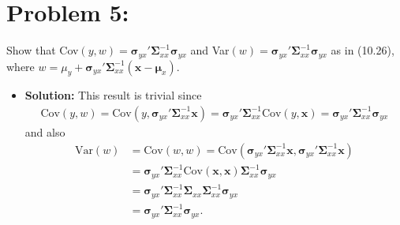 \documentclass[11pt]{article}
\begin{document}
\section*{Problem 5:}
Show that Cov$(y,w) = \bm\sigma_{yx}'\bm\Sigma_{xx}^{-1}\bm\sigma_{yx}$ and Var$(w) = \bm\sigma_{yx}'\bm\Sigma_{xx}^{-1}\bm\sigma_{yx}$ as in (10.26), where $w = \mu_y + \bm\sigma_{yx}'\bm\Sigma_{xx}^{-1}(\mathbf{x} - \bm\mu_x)$.
\begin{itemize}
\item[] \textbf{Solution:}  This result is trivial since
\begin{align*}
\text{Cov}(y,w) = \text{Cov}\left(y, \bm\sigma_{yx}'\bm\Sigma_{xx}^{-1}\mathbf{x}\right) = \bm\sigma_{yx}'\bm\Sigma_{xx}^{-1}\text{Cov}(y,\mathbf{x}) = \bm\sigma_{yx}'\bm\Sigma_{xx}^{-1}\bm\sigma_{yx}
\end{align*}
and also
\begin{align*}
\text{Var}(w) &= \text{Cov}(w,w) = \text{Cov}\left(\bm\sigma_{yx}'\bm\Sigma_{xx}^{-1}\mathbf{x},\bm\sigma_{yx}'\bm\Sigma_{xx}^{-1}\mathbf{x}\right) \\
&= \bm\sigma_{yx}'\bm\Sigma^{-1}_{xx}\text{Cov}(\mathbf{x},\mathbf{x})\bm\Sigma_{xx}^{-1}\bm\sigma_{yx} \\
&= \bm\sigma_{yx}'\bm\Sigma^{-1}_{xx}\bm\Sigma_{xx}\bm\Sigma_{xx}^{-1}\bm\sigma_{yx} \\
&= \bm\sigma_{yx}'\bm\Sigma^{-1}_{xx}\bm\sigma_{yx}.
\end{align*}
\end{itemize}
\end{document}
